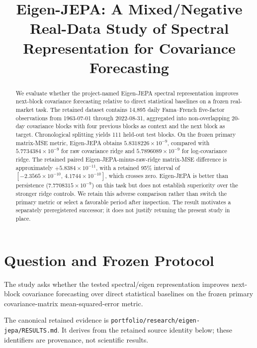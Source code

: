 \documentclass[10pt,conference]{IEEEtran}
\title{Eigen-JEPA: A Mixed/Negative Real-Data Study of Spectral Representation for Covariance Forecasting}
\author{\IEEEauthorblockN{Anonymous Authors}}
\begin{document}
\maketitle

\begin{abstract}
We evaluate whether the project-named Eigen-JEPA spectral representation improves next-block covariance forecasting relative to direct statistical baselines on a frozen real-market task. The retained dataset contains 14,895 daily Fama--French five-factor observations from 1963-07-01 through 2022-08-31, aggregated into non-overlapping 20-day covariance blocks with four previous blocks as context and the next block as target. Chronological splitting yields 111 held-out test blocks. On the frozen primary matrix-MSE metric, Eigen-JEPA obtains $5.8318226\times10^{-9}$, compared with $5.7734384\times10^{-9}$ for raw covariance ridge and $5.7896089\times10^{-9}$ for log-covariance ridge. The retained paired Eigen-JEPA-minus-raw-ridge matrix-MSE difference is approximately $+5.8384\times10^{-11}$, with a retained 95\% interval of $[-2.3565\times10^{-10},\,4.1744\times10^{-10}]$, which crosses zero. Eigen-JEPA is better than persistence ($7.7708315\times10^{-9}$) on this task but does not establish superiority over the stronger ridge controls. We retain this adverse comparison rather than switch the primary metric or select a favorable period after inspection. The result motivates a separately preregistered successor; it does not justify retuning the present study in place.
\end{abstract}

\section{Question and Frozen Protocol}
The study asks whether the tested spectral/eigen representation improves next-block covariance forecasting over direct statistical baselines on the frozen primary covariance-matrix mean-squared-error metric.

The canonical retained evidence is \texttt{portfolio/research/eigen-jepa/RESULTS.md}. It derives from the retained source identity below; these identifiers are provenance, not scientific results.

\par
{}\par
\end{document}
